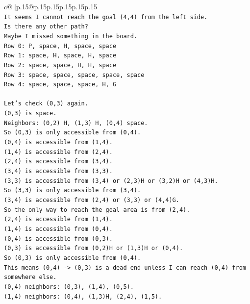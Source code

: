 \documentclass{article}
\begin{document}
{\begin{supertabular}{c@{$\;$}|p{.15\linewidth}@{}p{.15\linewidth}p{.15\linewidth}p{.15\linewidth}p{.15\linewidth}p{.15\linewidth}}
{{{\\ 
\texttt{It seems I cannot reach the goal (4,4) from the left side.} \\
\texttt{Is there any other path?} \\
\texttt{Maybe I missed something in the board.} \\
\texttt{Row 0: P, space, H, space, space} \\
\texttt{Row 1: space, H, space, H, space} \\
\texttt{Row 2: space, space, H, H, space} \\
\texttt{Row 3: space, space, space, space, space} \\
\texttt{Row 4: space, space, space, H, G} \\
\\ 
\texttt{Let's check (0,3) again.} \\
\texttt{(0,3) is space.} \\
\texttt{Neighbors: (0,2) H, (1,3) H, (0,4) space.} \\
\texttt{So (0,3) is only accessible from (0,4).} \\
\texttt{(0,4) is accessible from (1,4).} \\
\texttt{(1,4) is accessible from (2,4).} \\
\texttt{(2,4) is accessible from (3,4).} \\
\texttt{(3,4) is accessible from (3,3).} \\
\texttt{(3,3) is accessible from (3,4) or (2,3)H or (3,2)H or (4,3)H.} \\
\texttt{So (3,3) is only accessible from (3,4).} \\
\texttt{(3,4) is accessible from (2,4) or (3,3) or (4,4)G.} \\
\texttt{So the only way to reach the goal area is from (2,4).} \\
\texttt{(2,4) is accessible from (1,4).} \\
\texttt{(1,4) is accessible from (0,4).} \\
\texttt{(0,4) is accessible from (0,3).} \\
\texttt{(0,3) is accessible from (0,2)H or (1,3)H or (0,4).} \\
\texttt{So (0,3) is only accessible from (0,4).} \\
\texttt{This means (0,4) {-}> (0,3) is a dead end unless I can reach (0,4) from somewhere else.} \\
\texttt{(0,4) neighbors: (0,3), (1,4), (0,5).} \\
\texttt{(1,4) neighbors: (0,4), (1,3)H, (2,4), (1,5).} \\
}}}
\end{supertabular}}
\end{document}
